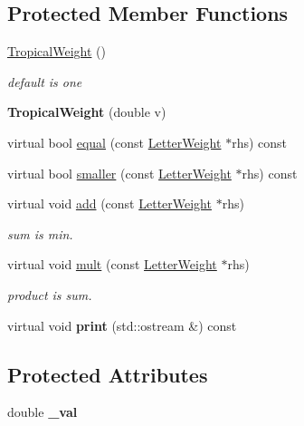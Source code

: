 \subsection*{Protected Member Functions}
\begin{DoxyCompactItemize}
\item 
\mbox{\label{classTropicalWeight_add8ba82f403d669abe6d7601f003bc77}} 
\mbox{\hyperlink{classTropicalWeight_add8ba82f403d669abe6d7601f003bc77}{Tropical\+Weight}} ()
\begin{DoxyCompactList}\small\item\em default is one \end{DoxyCompactList}\item 
\mbox{\label{classTropicalWeight_a09d45439a55d482120356f949c638da5}} 
{\bfseries Tropical\+Weight} (double v)
\item 
virtual bool \mbox{\hyperlink{group__weight_ga7203d6028f02a2791bdeede99ef59b97}{equal}} (const \mbox{\hyperlink{classLetterWeight}{Letter\+Weight}} $\ast$rhs) const
\item 
virtual bool \mbox{\hyperlink{group__weight_ga4237553cf4beafd5a96bd0ac7da7ac11}{smaller}} (const \mbox{\hyperlink{classLetterWeight}{Letter\+Weight}} $\ast$rhs) const
\item 
virtual void \mbox{\hyperlink{group__weight_ga41791f144fea9717092970563337d040}{add}} (const \mbox{\hyperlink{classLetterWeight}{Letter\+Weight}} $\ast$rhs)
\begin{DoxyCompactList}\small\item\em sum is min. \end{DoxyCompactList}\item 
virtual void \mbox{\hyperlink{group__weight_ga6bf7a669a9798ebbd6b4138cce2bade6}{mult}} (const \mbox{\hyperlink{classLetterWeight}{Letter\+Weight}} $\ast$rhs)
\begin{DoxyCompactList}\small\item\em product is sum. \end{DoxyCompactList}\item 
virtual void {\bfseries print} (std\+::ostream \&) const
\end{DoxyCompactItemize}
\subsection*{Protected Attributes}
\begin{DoxyCompactItemize}
\item 
\mbox{\label{classTropicalWeight_a8b8b7de0bd57c28630fb978daceeeffb}} 
double {\bfseries \+\_\+val}
\end{DoxyCompactItemize}
